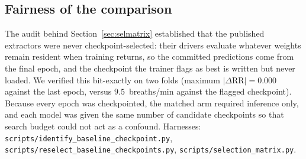 \subsection{Fairness of the comparison}
The audit behind Section~\ref{sec:selmatrix} established that the published extractors were never
checkpoint-selected: their drivers evaluate whatever weights remain resident when training returns, so
the committed predictions come from the final epoch, and the checkpoint the trainer flags as best is
written but never loaded. We verified this bit-exactly on two folds (maximum
$|\Delta\mathrm{RR}|=0.000$ against the last epoch, versus $9.5$~breaths/min against the flagged
checkpoint). Because every epoch was checkpointed, the matched arm required inference only, and each
model was given the same number of candidate checkpoints so that search budget could not act as a
confound. Harnesses: \texttt{scripts/identify\_baseline\_checkpoint.py},
\texttt{scripts/reselect\_baseline\_checkpoints.py}, \texttt{scripts/selection\_matrix.py}.
